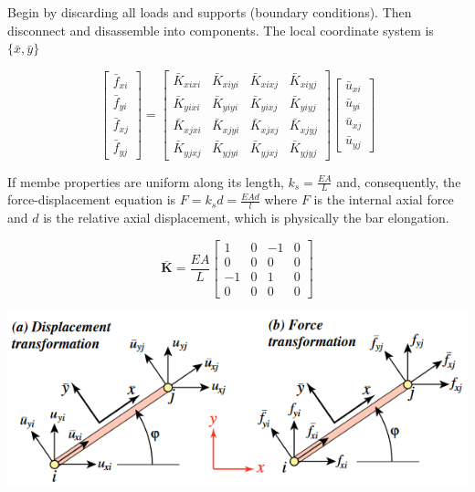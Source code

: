 \documentclass{article}
\begin{document}
\begin{multicols*}{2}
    Begin by discarding all loads and supports (boundary conditions). Then disconnect
    and disassemble into components. The local coordinate system is $\{ \bar{x},\bar{y}\}$\par 
    \begin{equation*}
        \begin{bmatrix}
            \bar{f}_{xi}\\
            \bar{f}_{yi}\\
            \bar{f}_{xj}\\
            \bar{f}_{yj}
        \end{bmatrix}
        =
        \begin{bmatrix}
            \bar{K}_{xixi} & \bar{K}_{xiyi} & \bar{K}_{xixj} & \bar{K}_{xiyj}\\
            \bar{K}_{yixi} & \bar{K}_{yiyi} & \bar{K}_{yixj} & \bar{K}_{yiyj}\\
            \bar{K}_{xjxi} & \bar{K}_{xjyi} & \bar{K}_{xjxj} & \bar{K}_{xjyj}\\
            \bar{K}_{yjxj} & \bar{K}_{yjyi} & \bar{K}_{yjxj} & \bar{K}_{yjyj}
        \end{bmatrix}
        \begin{bmatrix}
            \bar{u}_{xi}\\
            \bar{u}_{yi}\\
            \bar{u}_{xj}\\
            \bar{u}_{yj}
        \end{bmatrix}
    \end{equation*}

    If membe properties are uniform along its length, $k_s=\frac{EA}{L}$ and,
    consequently, the force-displacement equation is $F=k_sd=\frac{EAd}{l}$ 
    where $F$ is the internal axial force and $d$ is the relative axial displacement,
    which is physically the bar elongation.\par 
    \begin{equation*}
        \bar{\textbf{K}}=\frac{EA}{L}
        \begin{bmatrix}
            1 & 0 & -1 & 0\\
            0 & 0 & 0 & 0 \\
            -1 & 0 & 1 & 0\\
            0 & 0 & 0 & 0
        \end{bmatrix}
    \end{equation*}

    \includegraphics[width=\linewidth]{Figures/DSM1_phi.png}
    

\end{multicols*}
\end{document}
